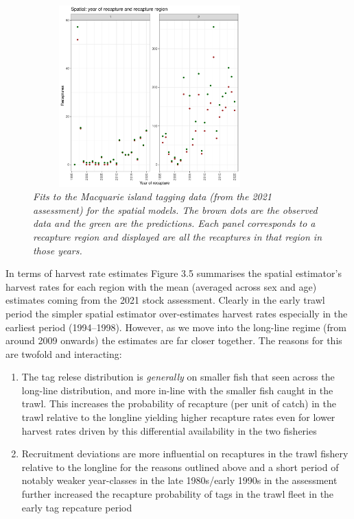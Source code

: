 \documentclass[12pt,a4paper,twoside,times,sky,standard]{csiroreport2017}
\begin{document}
\begin{figure}[hb]
    \begin{center}
        \includegraphics[width=9cm,height=7cm]{figs/spfits_recyrreg_macca.pdf}
    \end{center}
    \caption{\textit{Fits to the Macquarie island tagging data (from the 2021 assessment) for the spatial models. The brown dots are the observed data and the green are the predictions. Each panel corresponds to a recapture region and displayed are all the recaptures in that region in those years.}}
\end{figure}

In terms of harvest rate estimates Figure 3.5 summarises the spatial estimator's harvest rates for each region with the mean (averaged across sex and age) estimates coming from the 2021 stock assessment. Clearly in the early trawl period the simpler spatial estimator over-estimates harvest rates especially in the earliest period (1994--1998). However, as we move into the long-line regime (from around 2009 onwards) the estimates are far closer together. The reasons for this are twofold and interacting:

\begin{enumerate}
    \item The tag relese distribution is \emph{generally} on smaller fish that seen across the long-line distribution, and more in-line with the smaller fish caught in the trawl. This increases the probability of recapture (per unit of catch) in the trawl relative to the longline yielding higher recapture rates even for lower harvest rates driven by this differential availability in the two fisheries
    \item Recruitment deviations are more influential on recaptures in the trawl fishery relative to the longline for the reasons outlined above and a short period of notably weaker year-classes in the late 1980s/early 1990s in the assessment further increased the recapture probability of tags in the trawl fleet in the early tag repcature period
\end{enumerate}
\end{document}
